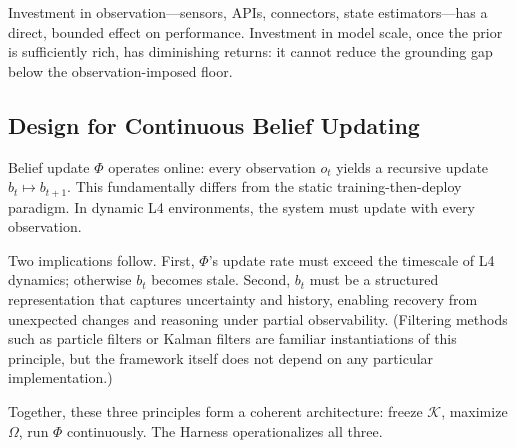 Investment in observation---sensors, APIs, connectors, state estimators---has a direct, bounded effect on performance. Investment in model scale, once the prior is sufficiently rich, has diminishing returns: it cannot reduce the grounding gap below the observation-imposed floor.

\subsection{Design for Continuous Belief Updating}

Belief update $\Phi$ operates online: every observation $o_t$ yields a recursive update $b_t \mapsto b_{t+1}$. This fundamentally differs from the static training-then-deploy paradigm. In dynamic L4 environments, the system must update with every observation.

Two implications follow. First, $\Phi$'s update rate must exceed the timescale of L4 dynamics; otherwise $b_t$ becomes stale. Second, $b_t$ must be a structured representation that captures uncertainty and history, enabling recovery from unexpected changes and reasoning under partial observability. (Filtering methods such as particle filters or Kalman filters are familiar instantiations of this principle, but the framework itself does not depend on any particular implementation.)

Together, these three principles form a coherent architecture: freeze $\mathcal{K}$, maximize $\Omega$, run $\Phi$ continuously. The Harness operationalizes all three.
